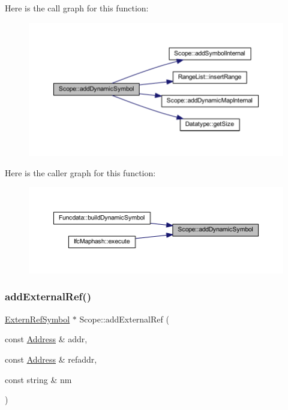 Here is the call graph for this function\+:
\nopagebreak
\begin{figure}[H]
\begin{center}
\leavevmode
\includegraphics[width=350pt]{class_scope_af42668b79a23d2e4e67f54e2185a2b58_cgraph}
\end{center}
\end{figure}
Here is the caller graph for this function\+:
\nopagebreak
\begin{figure}[H]
\begin{center}
\leavevmode
\includegraphics[width=350pt]{class_scope_af42668b79a23d2e4e67f54e2185a2b58_icgraph}
\end{center}
\end{figure}
\mbox{\label{class_scope_a648715fd4a06419df21ecdc060ff2911}} 
\subsubsection{\texorpdfstring{addExternalRef()}{addExternalRef()}}
{\footnotesize\ttfamily \mbox{\hyperlink{class_extern_ref_symbol}{Extern\+Ref\+Symbol}} $\ast$ Scope\+::add\+External\+Ref (\begin{DoxyParamCaption}\item[{const \mbox{\hyperlink{class_address}{Address}} \&}]{addr,  }\item[{const \mbox{\hyperlink{class_address}{Address}} \&}]{refaddr,  }\item[{const string \&}]{nm }\end{DoxyParamCaption})}

